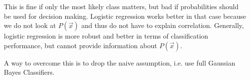 This is fine if only the most likely class
matters, but bad if probabilities should
be used for decision making.
Logistic regression works better in that case
because we do not look at $P(\vec{x})$ and thus
do not have to explain correlation.
Generally, logistic regression is more
robust and better in terms of classification
performance, but cannot provide information
about $P(\vec{x})$.

A way to overcome this is to
drop the naive assumption,
i.e. use full Gaussian Bayes Classifiers.
